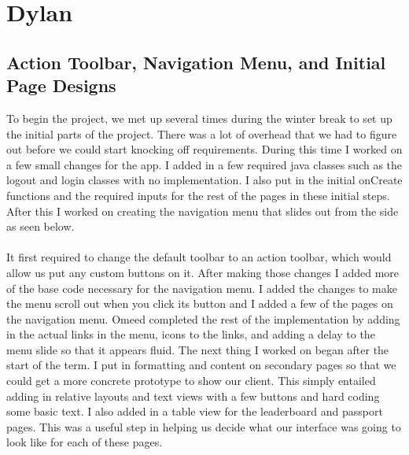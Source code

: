 \documentclass[draftclsnofoot, onecolumn, 10pt, compsoc]{IEEEtran}
\begin{document}
   \section{Dylan}
      \subsection{Action Toolbar, Navigation Menu, and Initial Page Designs}
         To begin the project, we met up several times during the winter break to set up the initial parts of the project. There was a lot of overhead that we had to figure out before we could start knocking off requirements. During this time I worked on a few small changes for the app. I added in a few required java classes such as the logout and login classes with no implementation. I also put in the initial onCreate functions and the required inputs for the rest of the pages in these initial steps. After this I worked on creating the navigation menu that slides out from the side as seen below. \\ \\

         It first required to change the default toolbar to an action toolbar, which would allow us put any custom buttons on it. After making those changes I added more of the base code necessary for the navigation menu. I added the changes to make the menu scroll out when you click its button and I added a few of the pages on the navigation menu. Omeed completed the rest of the implementation by adding in the actual links in the menu, icons to the links, and adding a delay to the menu slide so that it appears fluid. The next thing I worked on began after the start of the term. I put in formatting and content on secondary pages so that we could get a more concrete prototype to show our client. This simply entailed adding in relative layouts and text views with a few buttons and hard coding some basic text. I also added in a table view for the leaderboard and passport pages. This was a useful step in helping us decide what our interface was going to look like for each of these pages.
\end{document}
